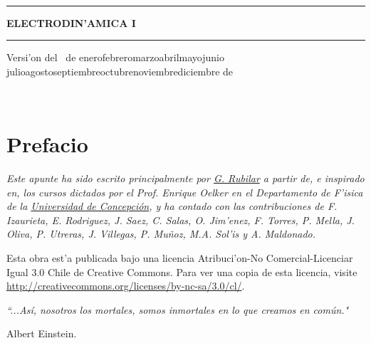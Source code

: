 \documentclass[letterpaper,11pt]{report}
\def\today{\number\day~de\space\ifcase\month\or
 enero\or febrero\or marzo\or abril\or mayo\or junio\or
 julio\or agosto\or septiembre\or octubre\or noviembre\or diciembre\fi
 \space de~\number\year}
\begin{document}
\thispagestyle{empty}
\begin{center}

\

\vspace{6.5cm}

\rule{15cm}{0.1cm}

\vspace{1.5cm}

{\huge \textsc{\textbf{ELECTRODIN'AMICA I}}}

\vspace{1.5cm}

\rule{15cm}{0.1cm}

\vspace{1.5cm}

Versi'on del \today

\end{center}

\newpage
\thispagestyle{empty}
\ \\
\newpage
\setcounter{page}{1}

\pagestyle{plain}
\chapter*{Prefacio}
\bigskip
\bigskip
\bigskip
\bigskip
\bigskip
\bigskip


\emph{Este apunte ha sido escrito principalmente por \href{https://google.com/+GuillermoRubilar}{G. Rubilar} a partir de, e inspirado en, los cursos dictados por el Prof. Enrique Oelker en el Departamento de F'isica de la \href{www.udec.cl}{Universidad de Concepci\'on}, y ha contado con las contribuciones de F. Izaurieta, E. Rodriguez, J. Saez, C. Salas, O. Jim'enez, F. Torres, P. Mella, J. Oliva, P. Utreras, J. Villegas, P. Mu\~noz, M.A. Sol'is y A. Maldonado.}

\bigskip


\bigskip

Esta obra est'a publicada bajo una licencia Atribuci'on-No Comercial-Licenciar Igual 3.0 Chile de Creative Commons. Para ver una copia de esta licencia, visite
\url{http://creativecommons.org/licenses/by-nc-sa/3.0/cl/}.

\bigskip
\bigskip
\bigskip


\bigskip
\bigskip
\bigskip



\emph{\textquotedblleft ...As\'i, nosotros los mortales, somos
inmortales en lo que creamos en com\'un."}

\begin{flushright}
Albert Einstein.
\end{flushright}

\newpage

\tableofcontents
{}
\setcounter{page}{1}


\newpage

\newpage

\newpage
\appendix

\newpage

\newpage

\end{document}
